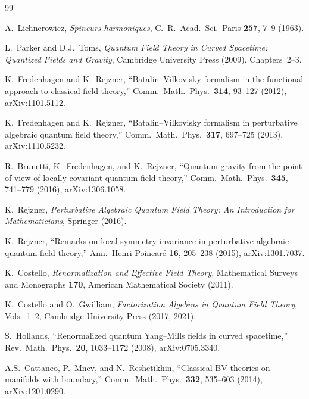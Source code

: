 \documentclass[11pt,a4paper]{article}
\begin{document}
\begin{thebibliography}{99}

A.~Lichnerowicz,
\emph{Spineurs harmoniques},
C.~R.\ Acad.\ Sci.\ Paris \textbf{257}, 7--9 (1963).

L.~Parker and D.J.~Toms,
\emph{Quantum Field Theory in Curved Spacetime:
Quantized Fields and Gravity},
Cambridge University Press (2009), Chapters~2--3.

K.~Fredenhagen and K.~Rejzner,
``Batalin--Vilkovisky formalism in the functional approach
to classical field theory,''
Comm.\ Math.\ Phys.\ \textbf{314}, 93--127 (2012),
arXiv:1101.5112.

K.~Fredenhagen and K.~Rejzner,
``Batalin--Vilkovisky formalism in perturbative algebraic
quantum field theory,''
Comm.\ Math.\ Phys.\ \textbf{317}, 697--725 (2013),
arXiv:1110.5232.

R.~Brunetti, K.~Fredenhagen, and K.~Rejzner,
``Quantum gravity from the point of view of locally covariant
quantum field theory,''
Comm.\ Math.\ Phys.\ \textbf{345}, 741--779 (2016),
arXiv:1306.1058.

K.~Rejzner,
\emph{Perturbative Algebraic Quantum Field Theory:
An Introduction for Mathematicians},
Springer (2016).

K.~Rejzner,
``Remarks on local symmetry invariance in perturbative
algebraic quantum field theory,''
Ann.\ Henri Poincar\'e \textbf{16}, 205--238 (2015),
arXiv:1301.7037.

K.~Costello,
\emph{Renormalization and Effective Field Theory},
Mathematical Surveys and Monographs \textbf{170},
American Mathematical Society (2011).

K.~Costello and O.~Gwilliam,
\emph{Factorization Algebras in Quantum Field Theory},
Vols.~1--2, Cambridge University Press (2017, 2021).

S.~Hollands,
``Renormalized quantum Yang--Mills fields in curved spacetime,''
Rev.\ Math.\ Phys.\ \textbf{20}, 1033--1172 (2008),
arXiv:0705.3340.

A.S.~Cattaneo, P.~Mnev, and N.~Reshetikhin,
``Classical BV theories on manifolds with boundary,''
Comm.\ Math.\ Phys.\ \textbf{332}, 535--603 (2014),
arXiv:1201.0290.


\end{thebibliography}
\end{document}
